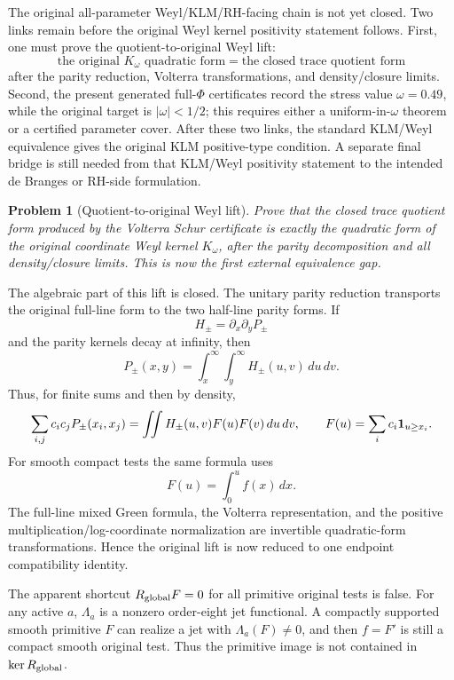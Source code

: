 \documentclass[11pt]{article}
\newtheorem{problem}[theorem]{Problem}
\begin{document}
The original all-parameter Weyl/KLM/RH-facing chain is not yet closed.  Two
links remain before the original Weyl kernel positivity statement follows.
First, one must prove the quotient-to-original Weyl lift:
\[
  \text{the original }K_\omega\text{ quadratic form}
  =
  \text{the closed trace quotient form}
\]
after the parity reduction, Volterra transformations, and density/closure
limits.  Second, the present generated full-\(\Phi\) certificates record the
stress value \(\omega=0.49\), while the original target is
\(|\omega|<1/2\); this requires either a uniform-in-\(\omega\) theorem or a
certified parameter cover.  After these two links, the standard KLM/Weyl
equivalence gives the original KLM positive-type condition.  A separate final
bridge is still needed from that KLM/Weyl positivity statement to the intended
de Branges or RH-side formulation.

\begin{problem}[Quotient-to-original Weyl lift]
Prove that the closed trace quotient form produced by the Volterra Schur
certificate is exactly the quadratic form of the original coordinate Weyl
kernel \(K_\omega\), after the parity decomposition and all density/closure
limits.  This is now the first external equivalence gap.
\end{problem}

The algebraic part of this lift is closed.  The unitary parity reduction
transports the original full-line form to the two half-line parity forms.  If
\[
  H_\pm=\partial_x\partial_y P_\pm
\]
and the parity kernels decay at infinity, then
\[
  P_\pm(x,y)=\int_x^\infty\int_y^\infty H_\pm(u,v)\,du\,dv.
\]
Thus, for finite sums and then by density,
\[
  \sum_{i,j}c_i c_jP_\pm(x_i,x_j)
  =
  \iint H_\pm(u,v)F(u)F(v)\,du\,dv,
  \qquad
  F(u)=\sum_i c_i{\bf 1}_{u\ge x_i}.
\]
For smooth compact tests the same formula uses
\[
  F(u)=\int_0^u f(x)\,dx.
\]
The full-line mixed Green formula, the Volterra representation, and the
positive multiplication/log-coordinate normalization are invertible
quadratic-form transformations.  Hence the original lift is now reduced to one
endpoint compatibility identity.

The apparent shortcut \(R_{\rm global}F=0\) for all primitive original tests is
false.  For any active \(a\), \(\Lambda_a\) is a nonzero order-eight jet
functional.  A compactly supported smooth primitive \(F\) can realize a jet
with \(\Lambda_a(F)\ne0\), and then \(f=F'\) is still a compact smooth original
test.  Thus the primitive image is not contained in \(\ker R_{\rm global}\).
\end{document}

